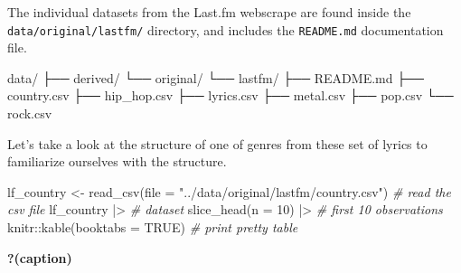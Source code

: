 \documentclass[
  letterpaper,
]{latex/krantz}
\newenvironment{Shaded}{\begin{snugshade}}{\end{snugshade}}
\newcommand{\AttributeTok}[1]{\textcolor[rgb]{0.00,0.00,0.00}{#1}}
\newcommand{\CommentTok}[1]{\textcolor[rgb]{0.00,0.00,0.00}{\textit{#1}}}
\newcommand{\ConstantTok}[1]{\textcolor[rgb]{0.00,0.00,0.00}{#1}}
\newcommand{\DecValTok}[1]{\textcolor[rgb]{0.00,0.00,0.00}{#1}}
\newcommand{\ExtensionTok}[1]{\textcolor[rgb]{0.00,0.00,0.00}{#1}}
\newcommand{\FunctionTok}[1]{\textcolor[rgb]{0.00,0.00,0.00}{#1}}
\newcommand{\NormalTok}[1]{\textcolor[rgb]{0.00,0.00,0.00}{#1}}
\newcommand{\OtherTok}[1]{\textcolor[rgb]{0.00,0.00,0.00}{#1}}
\newcommand{\SpecialCharTok}[1]{\textcolor[rgb]{0.00,0.00,0.00}{#1}}
\newcommand{\StringTok}[1]{\textcolor[rgb]{0.00,0.00,0.00}{#1}}
\begin{document}
The individual datasets from the Last.fm webscrape are found inside the
\texttt{data/original/lastfm/} directory, and includes the
\texttt{README.md} documentation file.

\begin{Shaded}
\begin{Highlighting}[]
\ExtensionTok{data/}
\ExtensionTok{├──}\NormalTok{ derived/}
\ExtensionTok{└──}\NormalTok{ original/}
    \ExtensionTok{└──}\NormalTok{ lastfm/}
        \ExtensionTok{├──}\NormalTok{ README.md}
        \ExtensionTok{├──}\NormalTok{ country.csv}
        \ExtensionTok{├──}\NormalTok{ hip\_hop.csv}
        \ExtensionTok{├──}\NormalTok{ lyrics.csv}
        \ExtensionTok{├──}\NormalTok{ metal.csv}
        \ExtensionTok{├──}\NormalTok{ pop.csv}
        \ExtensionTok{└──}\NormalTok{ rock.csv}
\end{Highlighting}
\end{Shaded}

Let's take a look at the structure of one of genres from these set of
lyrics to familiarize ourselves with the structure.

\begin{Shaded}
\begin{Highlighting}[]
\NormalTok{lf\_country }\OtherTok{\textless{}{-}} \FunctionTok{read\_csv}\NormalTok{(}\AttributeTok{file =} \StringTok{"../data/original/lastfm/country.csv"}\NormalTok{) }\CommentTok{\# read the csv file}
\NormalTok{lf\_country }\SpecialCharTok{|\textgreater{}} \CommentTok{\# dataset}
  \FunctionTok{slice\_head}\NormalTok{(}\AttributeTok{n =} \DecValTok{10}\NormalTok{) }\SpecialCharTok{|\textgreater{}} \CommentTok{\# first 10 observations }
\NormalTok{knitr}\SpecialCharTok{::}\FunctionTok{kable}\NormalTok{(}\AttributeTok{booktabs =} \ConstantTok{TRUE}\NormalTok{) }\CommentTok{\# print pretty table}
\end{Highlighting}
\end{Shaded}

\begin{table}

\caption{\textbf{?(caption)}}

\end{table}
\end{document}
